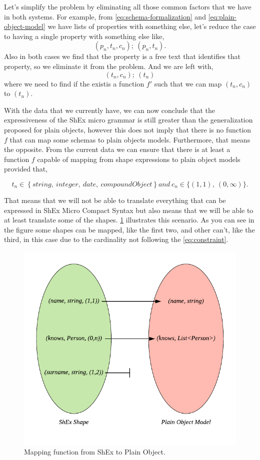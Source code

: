 Let's simplify the problem by eliminating all those common factors that we have in both systems. For example, from \cref{eq:schema-formalization} and \cref{eq:plain-object-model}
we have lists of properties with something else, let's reduce the case to having a single property with something else like,
\begin{equation}
    (p_n,t_n,c_n);\ (p_n,t_n).
\end{equation}
Also in both cases we find that the property is a free text that identifies that property, so we eliminate it from the problem. And we are left with,
\begin{equation}
    (t_n,c_n);\ (t_n)
\end{equation}
where we need to find if the existis a function $f'$ such that we can map $(t_n,c_n)$ to $(t_n)$.

With the data that we currently have, we can now conclude that the expressiveness of the ShEx micro grammar is still greater than the
generalization proposed for plain objects, however this does not imply that there is no function $f$ that can map some schemas to
plain objects models. Furthermore, that means the opposite. From the current data we can ensure that there is at least a function $f$ capable of
mapping from shape expressions to plain object models provided that,

\begin{equation}\label{eq:constraint}
    t_n \in \left \{ string,\ integer,\ date,\ compoundObject \right \} and\ c_n \in \{ (1,1),\ (0,\infty)\}.
\end{equation}

That means that we will not be able to translate everything that can be expressed in ShEx Micro Compact Syntax but also means that we will be able
to at least translate some of the shapes. \cref{fig:mapping-f} illustrates this scenario. As you can see in the figure some shapes can be mapped, like the first two,
and other can't, like the third, in this case due to the cardinality not following the \cref{eq:constraint}.

\begin{figure}
    \includegraphics{images/shex-lite-mapping.pdf}
    \centering
    \caption[Mapping function from ShEx to Plain Object]{Mapping function from ShEx to Plain Object.}
    \label{fig:mapping-f}
\end{figure}